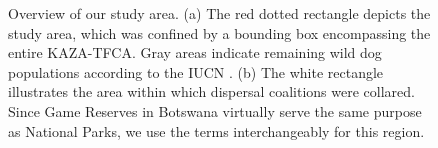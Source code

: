 \documentclass[abstract=on,10pt,a4paper,bibliography=totocnumbered]{article}
\begin{document}
\begin{figure}[h]
  \begin{center}
    \caption{Overview of our study area. (a) The red dotted rectangle depicts
    the study area, which was confined by a bounding box encompassing the entire
    KAZA-TFCA. Gray areas indicate remaining wild dog populations according to
    the IUCN \citep{Woodroffe.2012}. (b) The white rectangle illustrates the
    area within which dispersal coalitions were collared. Since Game Reserves in
    Botswana virtually serve the same purpose as National Parks, we use the
    terms interchangeably for this region.}
    \label{StudyArea}
  \end{center}
\end{figure}
\end{document}
